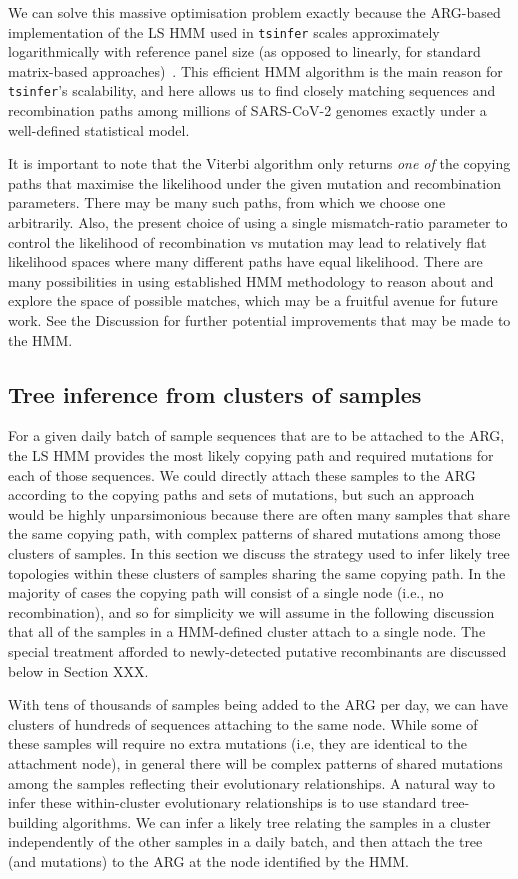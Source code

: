 \documentclass{article}
\begin{document}
We can solve this massive optimisation problem exactly because the ARG-based
implementation of the LS HMM used in \texttt{tsinfer} scales approximately
logarithmically with reference panel size (as opposed to linearly,
for standard matrix-based approaches)~\citep{Kelleher2019-ba}.
This efficient HMM algorithm is the main reason for \texttt{tsinfer}'s
scalability, and here allows us to find closely matching
sequences and recombination paths among millions of SARS-CoV-2
genomes exactly under a well-defined statistical model.

It is important to note that the Viterbi algorithm only returns
\emph{one of} the copying paths that maximise the likelihood under
 the given mutation and recombination parameters. There may be many
such paths, from which we choose one arbitrarily. Also, the
present choice of using a single mismatch-ratio parameter to control
the likelihood of recombination vs mutation may lead to relatively
flat likelihood spaces where many different paths have equal likelihood.
There are many possibilities in using established HMM methodology
to reason about and explore the space of possible matches, which may
be a fruitful avenue for future work. See the Discussion for further
potential improvements that may be made to the HMM.

\subsection{Tree inference from clusters of samples}
For a given daily batch of sample sequences that are to be attached to the
ARG, the LS HMM provides the most likely copying path and required mutations
for each of those sequences. We could directly attach these samples to
the ARG according to the copying paths and sets of mutations, but
such an approach would be highly unparsimonious because there are
often many samples that share the same copying path, with
complex patterns of shared mutations among those clusters of samples.
In this section we discuss the strategy used to infer likely tree
topologies within these clusters of samples sharing the same copying path.
In the majority of cases the copying path will consist of a single
node (i.e., no recombination), and so for simplicity we will assume in the
following discussion that all of the samples in a HMM-defined cluster
attach to a single node. The special treatment afforded to
newly-detected putative recombinants are discussed below
in Section XXX.

With tens of thousands of samples being added to the ARG per day,
we can have clusters of hundreds of sequences attaching to the same node.
While some of these samples will require no extra mutations
(i.e, they are identical to the attachment node), in general there
will be complex patterns of shared mutations among the samples
reflecting their evolutionary relationships. A natural way to infer
these within-cluster evolutionary relationships is to use standard
tree-building algorithms.
We can infer a likely tree relating the
samples in a cluster independently of the other samples in a
daily batch, and then attach the tree (and mutations)
to the ARG at the node identified by the HMM.
\end{document}
